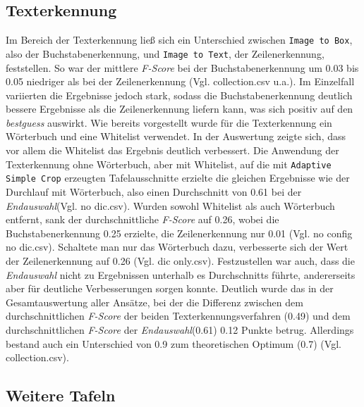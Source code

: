 \subsection{Texterkennung}
Im Bereich der Texterkennung ließ sich ein Unterschied zwischen \verb|Image to Box|, also der Buchstabenerkennung, und \verb|Image to Text|, der Zeilenerkennung, feststellen. So war der mittlere \textit{F-Score} bei der Buchstabenerkennung um 0.03 bis 0.05 niedriger als bei der Zeilenerkennung (Vgl. collection.csv u.a.). Im Einzelfall variierten die Ergebnisse jedoch stark, sodass die Buchstabenerkennung deutlich bessere Ergebnisse als die Zeilenerkennung liefern kann, was sich positiv auf den \textit{bestguess} auswirkt.
Wie bereits vorgestellt wurde für die Texterkennung ein Wörterbuch und eine Whitelist verwendet. In der Auswertung zeigte sich, dass vor allem die Whitelist das Ergebnis deutlich verbessert. Die Anwendung der Texterkennung ohne Wörterbuch, aber mit Whitelist, auf die mit \verb|Adaptive Simple Crop| erzeugten Tafelausschnitte erzielte die gleichen Ergebnisse wie der Durchlauf mit Wörterbuch, also einen Durchschnitt von 0.61 bei der \textit{Endauswahl}(Vgl. no dic.csv). Wurden sowohl Whitelist als auch Wörterbuch entfernt, sank der durchschnittliche \textit{F-Score} auf 0.26, wobei die Buchstabenerkennung 0.25 erzielte, die Zeilenerkennung nur 0.01 (Vgl. no config no dic.csv). Schaltete man nur das Wörterbuch dazu, verbesserte sich der Wert der Zeilenerkennung auf 0.26 (Vgl. dic only.csv).
Festzustellen war auch, dass die \textit{Endauswahl} nicht zu Ergebnissen unterhalb es Durchschnitts führte, andererseits aber für deutliche Verbesserungen sorgen konnte. Deutlich wurde das in der Gesamtauswertung aller Ansätze, bei der die Differenz zwischen dem durchschnittlichen \textit{F-Score} der beiden Texterkennungsverfahren (0.49) und dem durchschnittlichen \textit{F-Score} der \textit{Endauswahl}(0.61) 0.12 Punkte betrug. Allerdings bestand auch ein Unterschied von 0.9 zum theoretischen Optimum (0.7) (Vgl. collection.csv).


\subsection{Weitere Tafeln}

